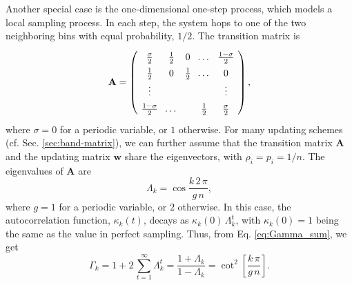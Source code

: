 \documentclass[reprint, floatfix]{revtex4-1}
\begin{document}
Another special case is the
one-dimensional one-step process\cite{vankampen},
which models a local sampling process.
In each step, the system hops to
one of the two neighboring bins
with equal probability, $1/2$.
%
The transition matrix is
%
\begin{equation}
  \arraycolsep=3.6pt\def\arraystretch{1.4}
  \mathbf A
  =
  \left(
    \begin{array}{cccccccc}
      \frac \sigma 2 & \frac 1 2 & 0 & \dots & \frac {1 - \sigma} 2 \\
      \frac 1 2 & 0         & \frac 1 2 & \dots & 0 \\
      \vdots & &  & & \vdots \\
      \frac {1 - \sigma} 2 & \dots &  & \frac 1 2 & \frac \sigma 2
    \end{array}
  \right),
\notag
\end{equation}
%
where $\sigma = 0$ for a periodic variable, or $1$ otherwise.
%
For many updating schemes
(cf. Sec. \ref{sec:band-matrix}),
we can further assume that
the transition matrix $\mathbf A$ and
the updating matrix $\mathbf w$
share the eigenvectors,
with $\rho_i = p_i = 1/n$.
%
The eigenvalues of $\mathbf A$ are
$$
  \Lambda_k
  =
  \cos \frac{ k \, 2 \, \pi }
            { g \, n        }
  ,
$$
where
$g = 1$ for a periodic variable, or $2$ otherwise.
%
In this case,
the autocorrelation function, $\kappa_k(t)$,
decays as $\kappa_k(0) \, \Lambda_k^t$,
with $\kappa_k(0) = 1$ being the same as
the value in perfect sampling.
%
Thus,
from Eq. \eqref{eq:Gamma_sum}, we get
%
\begin{equation}
  \Gamma_k
  =
  1 + 2 \, \sum_{t = 1}^\infty \Lambda_k^t
  =
  \frac{ 1 + \Lambda_k }
       { 1 - \Lambda_k }
  =
  \cot^2 \left[
    \frac{ k \, \pi }
         { g \, n   }
  \right]
  .
\label{eq:Gamma_onestep}
\end{equation}





\end{document}
